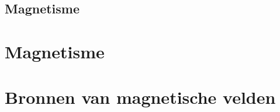 \documentclass{exam}
\begin{document}
\vspace{0.5cm}



\newpage

\vspace*{\fill}
\begin{center}
    
\section*{Magnetisme}
\end{center}

\vspace*{\fill}

\newpage

\section{Magnetisme}



\newpage

\section{Bronnen van magnetische velden}


\end{document}
